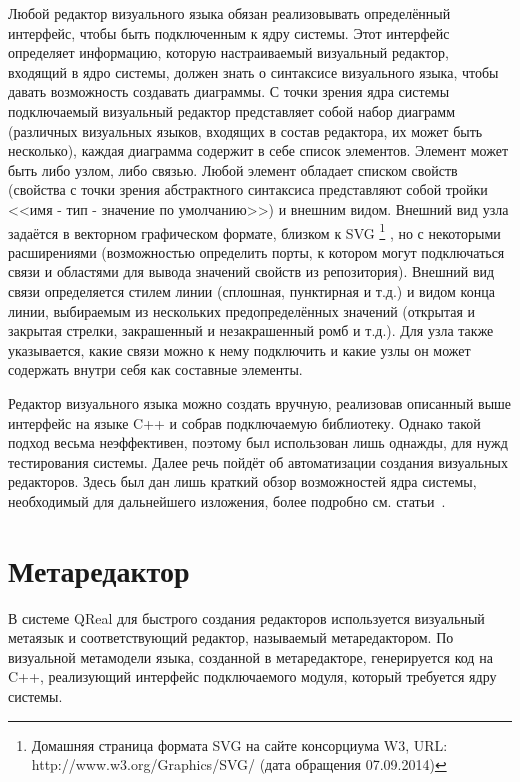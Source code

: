 Любой редактор визуального языка обязан реализовывать определённый интерфейс, чтобы 
быть подключенным к ядру системы. Этот интерфейс определяет информацию, которую настраиваемый 
визуальный редактор, входящий в ядро системы, должен знать о синтаксисе визуального 
языка, чтобы давать возможность создавать диаграммы. С точки зрения ядра системы подключаемый 
визуальный редактор представляет собой набор диаграмм (различных визуальных языков, 
входящих в состав редактора, их может быть несколько), каждая диаграмма содержит в 
себе список элементов. Элемент может быть либо узлом, либо связью. Любой элемент обладает 
списком свойств (свойства с точки зрения абстрактного синтаксиса представляют собой 
тройки <<имя - тип - значение по умолчанию>>) и внешним видом. Внешний вид узла задаётся в векторном графическом формате, близком к SVG%
\footnote{Домашняя страница формата SVG на сайте консорциума W3, URL: http://www.w3.org/Graphics/SVG/ (дата обращения 07.09.2014)}%
, но с некоторыми расширениями (возможностью определить порты, к котором могут подключаться связи и областями для вывода значений 
свойств из репозитория). Внешний вид связи определяется стилем линии (сплошная, пунктирная 
и т.д.) и видом конца линии, выбираемым из нескольких предопределённых значений (открытая 
и закрытая стрелки, закрашенный и незакрашенный ромб и т.д.). Для узла также указывается, 
какие связи можно к нему подключить и какие узлы он может содержать внутри себя как 
составные элементы.

Редактор визуального языка можно создать вручную, реализовав описанный выше интерфейс 
на языке C++ и собрав подключаемую библиотеку. Однако такой подход весьма неэффективен, 
поэтому был использован лишь однажды, для нужд тестирования системы. Далее речь пойдёт 
об автоматизации создания визуальных редакторов. Здесь был дан лишь краткий обзор 
возможностей ядра системы, необходимый для дальнейшего изложения, более подробно 
см. статьи~\cite{terekhov2009architecture, kuzenkova2011qreal, kuzenkova2013qreal}.

\section{Метаредактор}
В системе QReal для быстрого создания редакторов используется визуальный метаязык и 
соответствующий редактор, называемый метаредактором. По визуальной метамодели языка, 
созданной в метаредакторе, генерируется код на C++, реализующий интерфейс подключаемого 
модуля, который требуется ядру системы.


